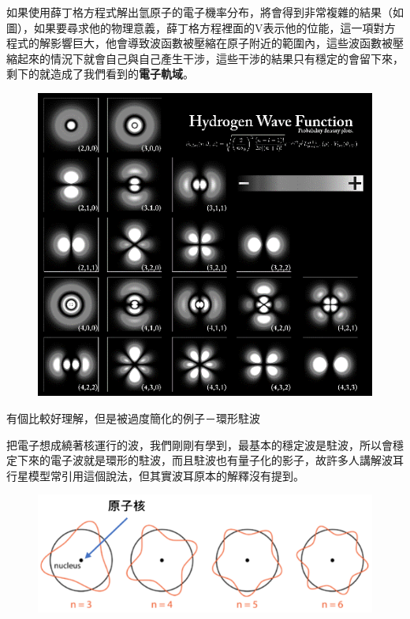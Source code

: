 \begin{tcolorbox}[breakable, title={薛丁格方程原子模型}, before upper={\parindent2em}, parbox=false]

如果使用薛丁格方程式解出氫原子的電子機率分布，將會得到非常複雜的結果（如圖），如果要尋求他的物理意義，薛丁格方程裡面的V表示他的位能，這一項對方程式的解影響巨大，他會導致波函數被壓縮在原子附近的範圍內，這些波函數被壓縮起來的情況下就會自己與自己產生干涉，這些干涉的結果只有穩定的會留下來，剩下的就造成了我們看到的\textbf{電子軌域}。
\begin{figure}[H]
\centering
\graphicspath{{physics/}}
\includegraphics[width=\linewidth, center]{wave-function.png}
\label{fig:wave-function}
\end{figure}
有個比較好理解，但是被過度簡化的例子－環形駐波

把電子想成繞著核運行的波，我們剛剛有學到，最基本的穩定波是駐波，所以會穩定下來的電子波就是環形的駐波，而且駐波也有量子化的影子，故許多人講解波耳行星模型常引用這個說法，但其實波耳原本的解釋沒有提到。
\begin{figure}[H]
\centering
\graphicspath{{physics/}}
\includegraphics[width=\linewidth, center]{standing-wave.png}
\label{fig:standing-wave}
\end{figure}
\end{tcolorbox}

